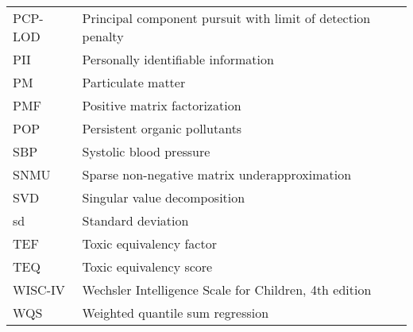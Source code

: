 \begingroup
\renewcommand{\arraystretch}{1.25}
\begin{table}[!ht]
\centering
\begin{tabular}{p{3cm}l}
PCP-LOD & Principal component pursuit with limit of detection penalty \\
PII & Personally identifiable information \\
PM & Particulate matter \\
PMF & Positive matrix factorization   \\
POP & Persistent organic pollutants   \\
SBP & Systolic blood pressure \\
SNMU & Sparse non-negative matrix underapproximation  \\
SVD & Singular value decomposition \\
sd & Standard deviation \\
TEF & Toxic equivalency factor \\
TEQ & Toxic equivalency score \\
WISC-IV & Wechsler Intelligence Scale for Children, 4th edition  \\
WQS & Weighted quantile sum regression \\
\end{tabular}
\end{table}
\endgroup

\clearpage
\makeatletter
\setlength{\@fptop}{0pt plus 1fil}
\setlength{\@fpbot}{0pt plus 1fil}
\makeatother